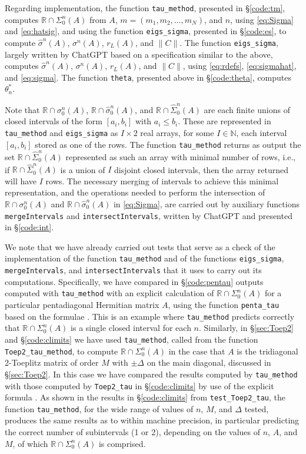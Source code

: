 \documentclass[preprint,1p,11pt]{elsarticle}
\newcommand\N{{\mathbb N}}
\newcommand\R{{\mathbb R}}
\numberwithin{equation}{section}   %
\numberwithin{figure}{section}  %
\begin{document}
Regarding implementation, the function \verb+tau_method+, presented in \S\ref{code:tm}, computes $\R\cap \Sigma_0^n(A)$ from $A$, $m=(m_1,m_2,\ldots,m_N)$, and $n$, using \eqref{eq:Sigma} and \eqref{eq:hatsig}, and using the function \verb+eigs_sigma+, presented in \S\ref{code:es}, to compute $\widehat \sigma^n(A)$, $\sigma^n(A)$, $r_L(A)$, and $\|C\|$. The function \verb+eigs_sigma+, largely written by ChatGPT based on a specification similar to the above, computes  $\widehat \sigma^n(A)$, $\sigma^n(A)$, $r_L(A)$, and $\|C\|$, using \eqref{eq:rdefs}, \eqref{eq:sigmahat}, and \eqref{eq:sigma}. The function \verb+theta+, presented above in \S\ref{code:theta}, computes $\theta^*_n$. 

Note that $\R\cap \sigma_0^n(A)$, $\R\cap \widehat \sigma_0^n(A)$, and $\R\cap \widehat \Sigma_0^n(A)$ are each finite unions of closed intervals of the form $[a_i,b_i]$ with $a_i\leq b_i$. These are represented in \verb+tau_method+ and \verb+eigs_sigma+ as $I\times 2$ real arrays, for some $I\in\N$, each interval $[a_i,b_i]$ stored as one of the rows. The function \verb+tau_method+ returns as output the set $\R\cap \widehat \Sigma_0^n(A)$ represented as such an array with minimal number of rows, i.e., if  $\R\cap \widehat \Sigma_0^n(A)$ is a union of $I$ disjoint closed intervals, then the array returned will have $I$ rows. The necessary merging of intervals to achieve this minimal representation, and the operations needed to perform the intersection of   $\R\cap \sigma_0^n(A)$ and $\R\cap \widehat \sigma_0^n(A)$ in \eqref{eq:Sigma}, are carried out by auxiliary functions \verb+mergeIntervals+ and \verb+intersectIntervals+, written by ChatGPT and presented in \S\ref{code:int}.

We note that we have already carried out tests that serve as a check of the implementation of the function  \verb+tau_method+ and of the functions  \verb+eigs_sigma+, \verb+mergeIntervals+, and \verb+intersectIntervals+ that it uses to carry out its computations. Specifically, we have compared in \S\ref{code:pentau} outputs computed with \verb+tau_method+ with an explicit calculation of $\R\cap \Sigma_0^n(A)$ for a particular pentadiagonal Hermitian matrix $A$, using the function \verb+penta_tau+ based on the formulae \cite[(5.40)]{CWL}. This is an example where \verb+tau_method+ predicts correctly that $\R\cap \Sigma_0^n(A)$ is a single closed interval for each $n$. Similarly, in \S\ref{sec:Toep2} and \S\ref{code:climits} we have used \verb+tau_method+, called from the function \verb+Toep2_tau_method+, to compute  $\R\cap \Sigma_0^n(A)$ in the case that $A$ is the tridiagonal 2-Toeplitz matrix of order $M$ with $\pm \Delta$ on the main diagonal, discussed in \S\ref{sec:Toep2}. In this case we have compared the results computed by \verb+tau_method+ with those computed by \verb+Toep2_tau+ in \S\ref{code:climits} by use of the explicit formula \cite[(5.47)]{CWL}. As shown in the results in \S\ref{code:climits} from \verb+test_Toep2_tau+, the function \verb+tau_method+, for the wide range of values of $n$, $M$, and $\Delta$ tested, produces the same results as \cite[(5.47)]{CWL} to within machine precision, in particular predicting the correct number of subintervals (1 or 2), depending on the values of $n$, $A$, and $M$, of which  $\R\cap \Sigma_0^n(A)$ is comprised.
\end{document}
